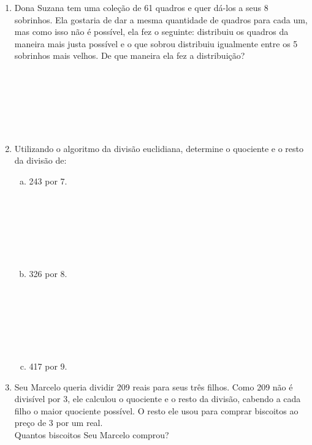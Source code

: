 \documentclass[a4paper,14pt]{article}
\begin{document}
\begin{multicols}{2}
\begin{enumerate}
   			\item Dona Suzana tem uma coleção de 61 quadros e quer dá-los a seus 8 sobrinhos. Ela gostaria de dar a mesma quantidade de quadros para cada um, mas como isso não é possível, ela fez o seguinte: distribuiu os quadros da maneira mais justa possível e o que sobrou distribuiu igualmente entre os 5 sobrinhos mais velhos. De que maneira ela fez a distribuição? \\\\\\\\\\\\\\
   			\item Utilizando o algoritmo da divisão euclidiana, determine o quociente e o resto da divisão de:
   			\begin{enumerate}[a)]
   				\item 243 por 7. \\\\\\\\\\\\\\
   				\item 326 por 8. \\\\\\\\\\\\\\
   				\item 417 por 9. \newpage
   			\end{enumerate}
   			\item Seu Marcelo queria dividir 209 reais para seus três filhos. Como 209 não é divisível por 3, ele calculou o quociente e o resto da divisão, cabendo a cada filho o maior quociente possível. O resto ele usou para comprar biscoitos ao preço de 3 por um real. \\ Quantos biscoitos Seu Marcelo comprou?  \\\\\\\\\\\\\\\\\\\\\\

\end{enumerate}
\end{multicols}
\end{document}
